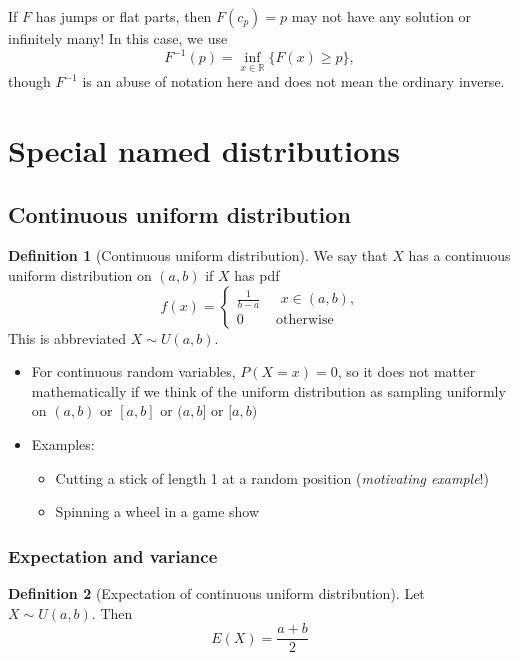 \documentclass[
]{book}
\providecommand{\tightlist}{%
  \setlength{\itemsep}{0pt}\setlength{\parskip}{0pt}}
\theoremstyle{definition}
\newtheorem{definition}{Definition}[chapter]
\theoremstyle{definition}
\theoremstyle{definition}
\theoremstyle{definition}
\theoremstyle{remark}
\begin{document}
If \(F\) has jumps or flat parts, then \(F(c_p)=p\) may not have any solution or infinitely many! In this case, we use
\[ F^{-1}(p)=\inf_{x\in\mathbb{R}}\{F(x)\geq p\},\]
though \(F^{-1}\) is an abuse of notation here and does not mean the ordinary inverse.

\section{Special named distributions}\label{special-named-distributions}

\subsection{Continuous uniform distribution}\label{continuous-uniform-distribution}

\begin{definition}[Continuous uniform distribution]
We say that \(X\) has a continuous uniform distribution on \((a,b)\) if \(X\) has pdf
\[ f(x) =\begin{cases}
      \frac{1}{b-a} & \mbox{ $x \in (a,b)$,} \\
      0 & \mbox{ otherwise }
   \end{cases}
\]
This is abbreviated \(X \sim U(a,b)\).
\end{definition}

\begin{itemize}
\tightlist
\item
  For continuous random variables, \(P(X=x)=0\), so it does not matter mathematically if we think of the uniform distribution as sampling uniformly on \((a,b)\) or \([a,b]\) or \((a,b]\) or \([a,b)\)
\item
  Examples:

  \begin{itemize}
  \tightlist
  \item
    Cutting a stick of length 1 at a random position (\emph{motivating example}!)
  \item
    Spinning a wheel in a game show
  \end{itemize}
\end{itemize}

\subsubsection{Expectation and variance}\label{expectation-and-variance}

\begin{definition}[Expectation of continuous uniform distribution]
Let \(X\sim U(a,b)\). Then
\[E(X) = \frac{a + b}{2}\]
\end{definition}
\end{document}
